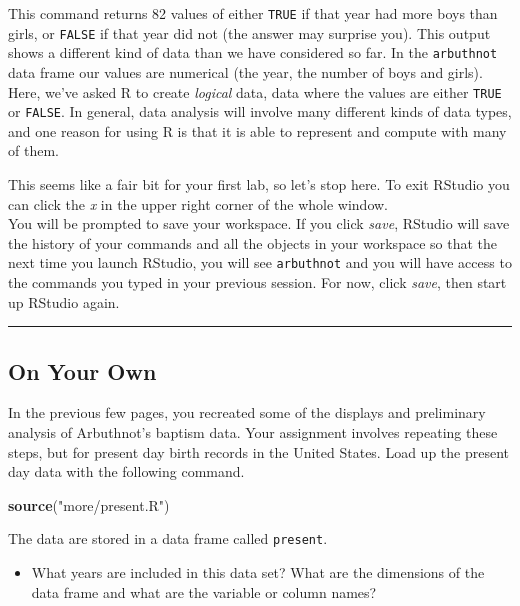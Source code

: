 \documentclass[]{article}
\newenvironment{Shaded}{\begin{snugshade}}{\end{snugshade}}
\newcommand{\KeywordTok}[1]{\textcolor[rgb]{0.13,0.29,0.53}{\textbf{#1}}}
\newcommand{\StringTok}[1]{\textcolor[rgb]{0.31,0.60,0.02}{#1}}
\newcommand{\NormalTok}[1]{#1}
\providecommand{\tightlist}{%
  \setlength{\itemsep}{0pt}\setlength{\parskip}{0pt}}
\begin{document}
This command returns 82 values of either \texttt{TRUE} if that year had
more boys than girls, or \texttt{FALSE} if that year did not (the answer
may surprise you). This output shows a different kind of data than we
have considered so far. In the \texttt{arbuthnot} data frame our values
are numerical (the year, the number of boys and girls). Here, we've
asked R to create \emph{logical} data, data where the values are either
\texttt{TRUE} or \texttt{FALSE}. In general, data analysis will involve
many different kinds of data types, and one reason for using R is that
it is able to represent and compute with many of them.

This seems like a fair bit for your first lab, so let's stop here. To
exit RStudio you can click the \emph{x} in the upper right corner of the
whole window.\\
You will be prompted to save your workspace. If you click \emph{save},
RStudio will save the history of your commands and all the objects in
your workspace so that the next time you launch RStudio, you will see
\texttt{arbuthnot} and you will have access to the commands you typed in
your previous session. For now, click \emph{save}, then start up RStudio
again.

\begin{center}\rule{0.5\linewidth}{\linethickness}\end{center}

\subsection{On Your Own}\label{on-your-own}

In the previous few pages, you recreated some of the displays and
preliminary analysis of Arbuthnot's baptism data. Your assignment
involves repeating these steps, but for present day birth records in the
United States. Load up the present day data with the following command.

\begin{Shaded}
\begin{Highlighting}[]
\KeywordTok{source}\NormalTok{(}\StringTok{"more/present.R"}\NormalTok{)}
\end{Highlighting}
\end{Shaded}

The data are stored in a data frame called \texttt{present}.

\begin{itemize}
\tightlist
\item
  What years are included in this data set? What are the dimensions of
  the data frame and what are the variable or column names?
\end{itemize}
\end{document}

